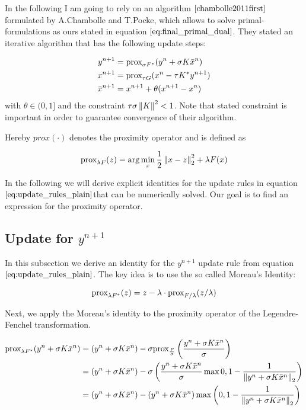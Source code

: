 In the following I am going to rely on an algorithm $\cite{chambolle2011first}$ formulated by A.Chambolle and T.Pocke, which allows to solve primal-formulations as ours stated in equation $\ref{eq:final_primal_dual}$.
They stated an iterative algorithm that has the following update steps:

\begin{align}
	y^{n+1} &= \text{prox}_{\sigma F^*}(y^n + \sigma K \bar{x}^n) \nonumber \\
	x^{n+1} &= \text{prox}_{\tau G}(x^n - \tau K^* y^{n+1}) \\
	\bar{x}^{n+1} &= x^{n+1} + \theta(x^{n+1} - x^n)
\label{eq:update_rules_plain}	
\end{align}
with $\theta \in (0, 1]$ and the constraint $\tau \sigma \left\lVert K\right\rVert^2 < 1$. Note that stated constraint is important in order to guarantee convergence of their algorithm.

Hereby $prox(\cdot)$ denotes the proximity operator and is defined as 

\begin{equation}
	\text{prox}_{\lambda F}(z) = \arg \min_x \frac{1}{2} \left\lVert x - z\right\rVert_2^2 + \lambda F(x)
\end{equation}

In the following we will derive explicit identities for the update rules in equation $\ref{eq:update_rules_plain}$that can be numerically solved. Our goal is to find an expression for the proximity operator.

\subsection{Update for $y^{n+1}$}

In this subsection we derive an identity for the $y^{n+1}$ update rule from equation $\ref{eq:update_rules_plain}$. The key idea is to use the so called Moreau's Identity:  

\begin{equation}
	\text{prox}_{\lambda F^*}(z) = z - \lambda \cdot \text{prox}_{F/ \lambda}(z / \lambda) 
\label{eq:moreau}	
\end{equation}

Next, we apply the Moreau's identity to the proximity operator of the Legendre-Fenchel transformation.


\begin{align}
	\text{prox}_{\lambda F^*}(y^n + \sigma K \bar{x}^{n}) 
	&= (y^n + \sigma K \bar{x}^{n}) - \sigma \text{prox}_{\frac{F}{\sigma} } \left(\frac{y^n + \sigma K \bar{x}^{n} }{\sigma} \right) \nonumber \\
	&= (y^n + \sigma K \bar{x}^{n}) - \sigma \left( \frac{y^n + \sigma K \bar{x}^{n} }{\sigma} \max{0, 1-\frac{1}{\left\lVert y^n + \sigma K \bar{x}^{n} \right\rVert_2}} \right) \nonumber \\
	&= (y^n + \sigma K \bar{x}^{n}) - \left( y^n + \sigma K \bar{x}^{n} \right) \max{\left(0, 1-\frac{1}{\left\lVert y^n + \sigma K \bar{x}^{n} \right\rVert_2}\right)}  
\label{eq:y_n_1_expression}
\end{align}

